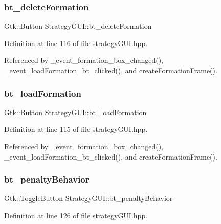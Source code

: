 \subsubsection{\texorpdfstring{bt\+\_\+delete\+Formation}{bt\_deleteFormation}}
{\footnotesize\ttfamily Gtk\+::\+Button Strategy\+G\+U\+I\+::bt\+\_\+delete\+Formation}



Definition at line 116 of file strategy\+G\+U\+I.\+hpp.



Referenced by \+\_\+event\+\_\+formation\+\_\+box\+\_\+changed(), \+\_\+event\+\_\+load\+Formation\+\_\+bt\+\_\+clicked(), and create\+Formation\+Frame().

\mbox{\label{class_strategy_g_u_i_a89efee7959e39e3c993080d88262521d}} 
\subsubsection{\texorpdfstring{bt\+\_\+load\+Formation}{bt\_loadFormation}}
{\footnotesize\ttfamily Gtk\+::\+Button Strategy\+G\+U\+I\+::bt\+\_\+load\+Formation}



Definition at line 115 of file strategy\+G\+U\+I.\+hpp.



Referenced by \+\_\+event\+\_\+formation\+\_\+box\+\_\+changed(), \+\_\+event\+\_\+load\+Formation\+\_\+bt\+\_\+clicked(), and create\+Formation\+Frame().

\mbox{\label{class_strategy_g_u_i_ae35ac01a050961304f3cc374e814c9dd}} 
\subsubsection{\texorpdfstring{bt\+\_\+penalty\+Behavior}{bt\_penaltyBehavior}}
{\footnotesize\ttfamily Gtk\+::\+Toggle\+Button Strategy\+G\+U\+I\+::bt\+\_\+penalty\+Behavior}



Definition at line 126 of file strategy\+G\+U\+I.\+hpp.

